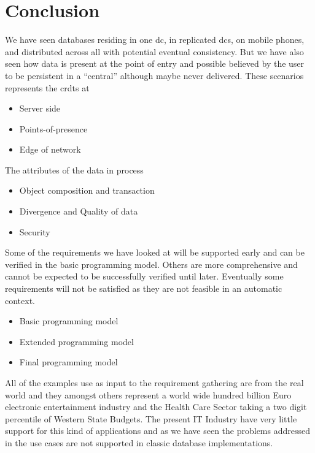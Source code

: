 \section{Conclusion}
We have seen databases residing in one \gls{dc}, in replicated \glspl{dc}, on mobile phones, and distributed across all with potential eventual consistency. But we have also seen how data is present at the point of entry and possible believed by the user to be persistent in a ``central'' although maybe never delivered. These scenarios represents the \glspl{crdt} at 
\begin{itemize}
	\item Server side
	\item Points-of-presence
	\item Edge of network
\end{itemize}
The attributes of the data in process
\begin{itemize}
	\item Object composition and transaction
	\item Divergence and Quality of data
	\item Security
\end{itemize}
Some of the requirements we have looked at will be supported early and can be verified in the basic programming model. Others are more comprehensive and cannot be expected to be successfully verified until later. Eventually some requirements will not be satisfied as they are not feasible in an automatic context.
\begin{itemize}
	\item Basic programming model
	\item Extended programming model
	\item Final programming model
\end{itemize}
All of the examples use as input to the requirement gathering are from the real world and they amongst others represent a world wide hundred billion Euro electronic entertainment industry and the Health Care Sector taking a two digit percentile of Western State Budgets. The present IT Industry have very little support for this kind of applications and as we have seen the problems addressed in the use cases are not supported in classic database implementations.
